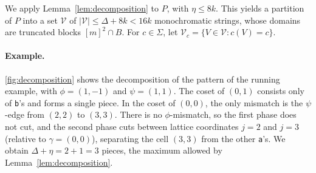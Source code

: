\documentclass[11pt]{article}
\theoremstyle{definition}
\newcommand{\cV}{\mathcal{V}}
\newcommand{\abs}[1]{\lvert #1 \rvert}
\newcommand{\str}[1]{\texttt{#1}}
\begin{document}
We apply Lemma~\ref{lem:decomposition} to $P$, with $\eta \le 8k$.
This yields a partition of $P$ into a set $\cV$ of $\abs{\cV} \le \Delta + 8k < 16k$ monochromatic strings, whose domains are truncated blocks $[m]^2 \cap B$.
For $c \in \Sigma$, let $\cV_c = \{V \in \cV : c(V) = c\}$.

\paragraph{Example.}
\autoref{fig:decomposition} shows the decomposition of the pattern of the running example, with $\phi = (1,-1)$ and $\psi = (1,1)$.
The coset of $(0,1)$ consists only of \str{b}'s and forms a single piece.
In the coset of $(0,0)$, the only mismatch is the $\psi$-edge from $(2,2)$ to $(3,3)$.
There is no $\phi$-mismatch, so the first phase does not cut, and the second phase cuts between lattice coordinates $j = 2$ and $j = 3$ (relative to $\gamma = (0,0)$), separating the cell $(3,3)$ from the other \str{a}'s.
We obtain $\Delta + \eta = 2 + 1 = 3$ pieces, the maximum allowed by Lemma~\ref{lem:decomposition}.
\end{document}
